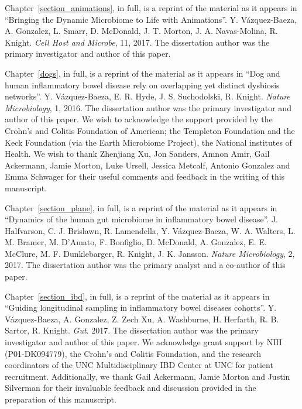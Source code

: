 \begin{frontmatter}
\begin{acknowledgements}
    Chapter~\ref{section_animations}, in full, is a reprint of the material as 
    it appears in ``Bringing the Dynamic Microbiome to Life with Animations''.  
    Y.  V\'azquez-Baeza, A. Gonzalez, L. Smarr, D.  McDonald, J.  T. Morton, J.  
    A.  Navas-Molina, R. Knight. \emph{Cell Host and Microbe}, 11, 2017. The 
    dissertation author was the primary investigator and author of this 
    paper.

    Chapter~\ref{dogs}, in full, is a reprint of the material as it appears in 
    ``Dog and human inflammatory bowel disease rely on overlapping yet distinct 
    dysbiosis networks''. Y. V\'azquez-Baeza, E. R. Hyde, J. S.  Suchodolski, 
    R. Knight.  \emph{Nature Microbiology}, 1, 2016. The dissertation 
    author was the primary investigator and author of this paper. We wish to 
    acknowledge the support provided by the Crohn's and Colitis Foundation of 
    American; the Templeton Foundation and the Keck Foundation (via the Earth 
    Microbiome Project), the National institutes of Health. We wish to thank 
    Zhenjiang Xu, Jon Sanders, Amnon Amir, Gail Ackermann, Jamie Morton, Luke 
    Ursell, Jessica Metcalf, Antonio Gonzalez and Emma Schwager for their 
    useful comments and feedback in the writing of this manuscript. 

    Chapter~\ref{section_plane}, in full, is a reprint of the material as it 
    appears in ``Dynamics of the human gut microbiome in inflammatory bowel 
    disease''.  J. Halfvarson, C. J. Brislawn, R. Lamendella, Y.  
    V\'azquez-Baeza, W. A. Walters, L. M. Bramer, M. D'Amato, F.  Bonfiglio, D.  
    McDonald, A. Gonzalez, E. E. McClure, M. F. Dunklebarger, R. Knight, J.  K.  
    Jansson. \emph{Nature Microbiology}, 2, 2017. The dissertation 
    author was the primary analyst and a co-author of this paper.

    Chapter~\ref{section_ibd}, in full, is a reprint of the material as it 
    appears in ``Guiding longitudinal sampling in inflammatory bowel diseases 
    cohorts''. Y. V\'azquez-Baeza, A. Gonzalez, Z. Zech Xu, A. Washburne, H.  
    Herfarth, R.  B.  Sartor, R. Knight. \emph{Gut}. 2017. The 
    dissertation author was the primary investigator and author of this 
    paper. We acknowledge grant support by NIH (P01-DK094779), the Crohn's and 
    Colitis Foundation, and the research coordinators of the UNC 
    Multidisciplinary IBD Center at UNC for patient recruitment. Additionally, 
    we thank Gail Ackermann, Jamie Morton and Justin Silverman for their 
    invaluable feedback and discussion provided in the preparation of this 
    manuscript.


\end{acknowledgements}
\end{frontmatter}
